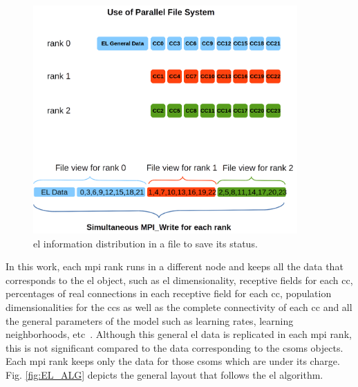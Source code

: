{\begin{figure}[h!]
    \centering
    \includegraphics[width=0.9\textwidth]{MPI_IO.png}
    \caption{\gls{el} information distribution in a file to save its status.}
    \label{fig:MPI_IO}
\end{figure}

In this work, each \gls{mpi} rank runs in a different node and keeps all the data that corresponds to the \gls{el} object, such as \gls{el} dimensionality, receptive fields for each \gls{cc}, percentages of real connections in each receptive field for each \gls{cc}, population dimensionalities for the \glspl{cc} as well as the complete connectivity of each \gls{cc} and all the general parameters of the model such as learning rates, learning neighborhoods, etc~\cite{10.1371/journal.pone.0217966}. Although this general \gls{el} data is replicated in each \gls{mpi} rank, this is not significant compared to the data corresponding to the \glspl{csom} objects. Each \gls{mpi} rank keeps only the data for those \glspl{csom} which are under its charge. Fig. \ref{fig:EL_ALG} depicts the general layout that follows the \gls{el} algorithm.

}
